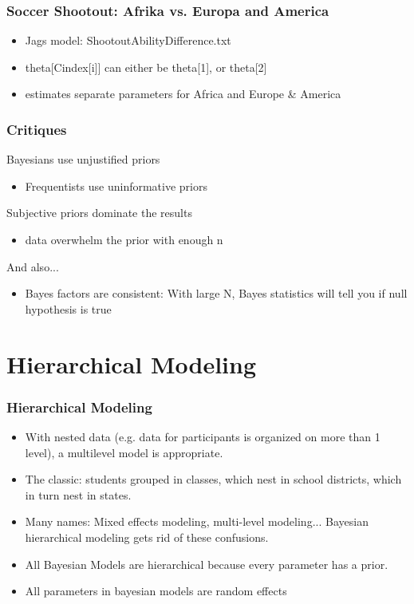 \documentclass[hyperref={pdfpagelabels=false},unknownkeysallowed]{beamer}
\begin{document}
\begin{frame}
\frametitle{Soccer Shootout: Afrika vs. Europa and America}
\begin{itemize}
\item Jags model: ShootoutAbilityDifference.txt
\item theta[Cindex[i]] can either be theta[1], or theta[2]
\item estimates separate parameters for Africa and Europe \& America
\end{itemize}
\note{}
\end{frame}


\begin{frame}
\frametitle{Critiques}
Bayesians use unjustified priors
\begin{itemize} \item Frequentists use uninformative priors \end{itemize}
Subjective priors dominate the results
\begin{itemize} \item data overwhelm the prior with enough n \end{itemize}
And also...
\begin{itemize} \item Bayes factors are consistent: With large N, Bayes statistics will tell you if null hypothesis is true \end{itemize}
\note{}
\end{frame}



\section{Hierarchical Modeling}
\begin{frame}
\frametitle{Hierarchical Modeling}

\begin{itemize}
\item With nested data (e.g. data for participants is organized on more than 1 level), a multilevel model is appropriate. 

\item The classic: students grouped in classes, which nest in school districts, which in turn nest in states. 


\item Many names: Mixed effects modeling, multi-level modeling... Bayesian hierarchical modeling gets rid of these confusions. 
\item All Bayesian Models are hierarchical because every parameter has a prior. 
\item All parameters in bayesian models are random effects
\end{itemize} 

\note{}
\end{frame}
\end{document}
